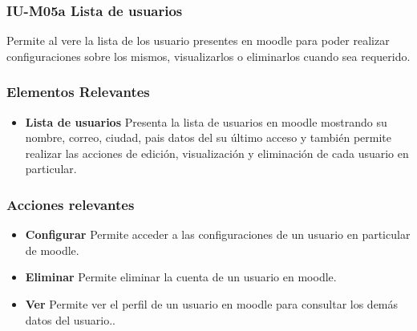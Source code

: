 
\subsubsection{IU-M05a Lista de usuarios}

 Permite al  vere la lista de los usuario presentes en moodle
 para poder realizar configuraciones sobre los mismos, visualizarlos o eliminarlos
 cuando sea requerido.


\subsubsection{Elementos Relevantes}

    \begin{itemize}
    \item {\bf Lista de usuarios}
        Presenta la lista de usuarios en moodle mostrando su nombre, correo, ciudad,
        pais datos del su último acceso y también permite realizar las acciones de
        edición, visualización y eliminación de cada usuario en particular.
    \end{itemize}

\subsubsection{Acciones relevantes}

    \begin{itemize}
    \item {\bf Configurar}
        Permite acceder a las configuraciones de un usuario en particular
        de moodle.
    \item {\bf Eliminar}
        Permite eliminar la cuenta de un usuario en moodle.
    \item {\bf Ver}
        Permite ver el perfil de un usuario en moodle para consultar los demás
        datos del usuario..
    \end{itemize}

\clearpage
